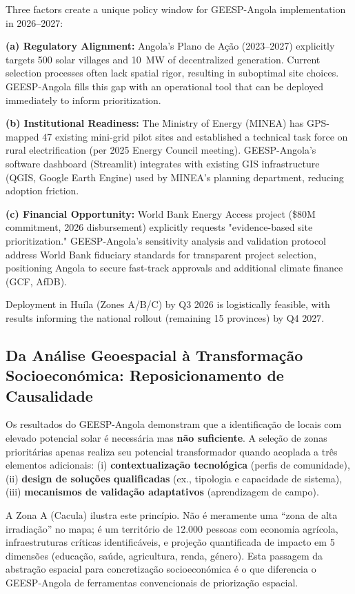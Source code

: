\documentclass[12pt, a4paper]{article}
\begin{document}
\begin{itemize}
Three factors create a unique policy window for GEESP-Angola implementation in 2026--2027:

\textbf{(a) Regulatory Alignment:} Angola's Plano de Ação (2023--2027) explicitly targets 500 solar villages and 10~MW of decentralized generation. Current selection processes often lack spatial rigor, resulting in suboptimal site choices. GEESP-Angola fills this gap with an operational tool that can be deployed immediately to inform prioritization.

\textbf{(b) Institutional Readiness:} The Ministry of Energy (MINEA) has GPS-mapped 47 existing mini-grid pilot sites and established a technical task force on rural electrification (per 2025 Energy Council meeting). GEESP-Angola's software dashboard (Streamlit) integrates with existing GIS infrastructure (QGIS, Google Earth Engine) used by MINEA's planning department, reducing adoption friction.

\textbf{(c) Financial Opportunity:} World Bank Energy Access project (\$80M commitment, 2026 disbursement) explicitly requests "evidence-based site prioritization." GEESP-Angola's sensitivity analysis and validation protocol address World Bank fiduciary standards for transparent project selection, positioning Angola to secure fast-track approvals and additional climate finance (GCF, AfDB).

Deployment in Huíla (Zones A/B/C) by Q3 2026 is logistically feasible, with results informing the national rollout (remaining 15 provinces) by Q4 2027.

\subsection{Da Análise Geoespacial à Transformação Socioeconómica: Reposicionamento de Causalidade}

Os resultados do GEESP-Angola demonstram que a identificação de locais com elevado 
potencial solar é necessária mas \textbf{não suficiente}. A seleção de zonas prioritárias 
apenas realiza seu potencial transformador quando acoplada a três elementos adicionais: 
(i) \textbf{contextualização tecnológica} (perfis de comunidade), (ii) \textbf{design de 
soluções qualificadas} (ex., tipologia e capacidade de sistema), (iii) \textbf{mecanismos 
de validação adaptativos} (aprendizagem de campo).

A Zona A (Cacula) ilustra este princípio. Não é meramente uma ``zona de alta irradiação'' 
no mapa; é um território de 12.000 pessoas com economia agrícola, infraestruturas críticas 
identificáveis, e projeção quantificada de impacto em 5 dimensões (educação, saúde, 
agricultura, renda, género). Esta passagem da abstração espacial para concretização 
socioeconómica é o que diferencia o GEESP-Angola de ferramentas convencionais de 
priorização espacial.


\end{itemize}
\end{document}
